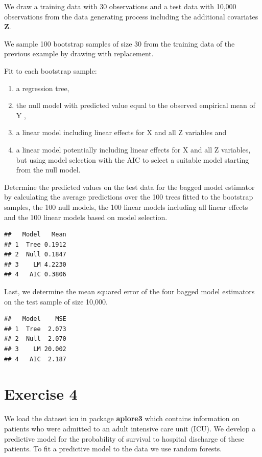 \documentclass[
]{article}
\begin{document}
We draw a training data with 30 observations and a test data with 10,000
observations from the data generating process including the additional
covariates \textbf{Z}.

We sample 100 bootstrap samples of size 30 from the training data of the
previous example by drawing with replacement.

Fit to each bootstrap sample:

\begin{enumerate}
\item a regression tree,
\item the null model with predicted value equal to the observed empirical mean of Y ,
\item a linear model including linear effects for X and all Z variables and
\item a linear model potentially including linear effects for X and all Z variables, but using model selection
with the AIC to select a suitable model starting from the null model.
\end{enumerate}

Determine the predicted values on the test data for the bagged model
estimator by calculating the average predictions over the 100 trees
fitted to the bootstrap samples, the 100 null models, the 100 linear
models including all linear effects and the 100 linear models based on
model selection.

\begin{verbatim}
##   Model   Mean
## 1  Tree 0.1912
## 2  Null 0.1847
## 3    LM 4.2230
## 4   AIC 0.3806
\end{verbatim}

Last, we determine the mean squared error of the four bagged model
estimators on the test sample of size 10,000.

\begin{verbatim}
##   Model    MSE
## 1  Tree  2.073
## 2  Null  2.070
## 3    LM 20.002
## 4   AIC  2.187
\end{verbatim}

\section{Exercise 4}\label{exercise-4}

We load the dataset icu in package \textbf{aplore3} which contains
information on patients who were admitted to an adult intensive care
unit (ICU). We develop a predictive model for the probability of
survival to hospital discharge of these patients. To fit a predictive
model to the data we use random forests.
\end{document}
